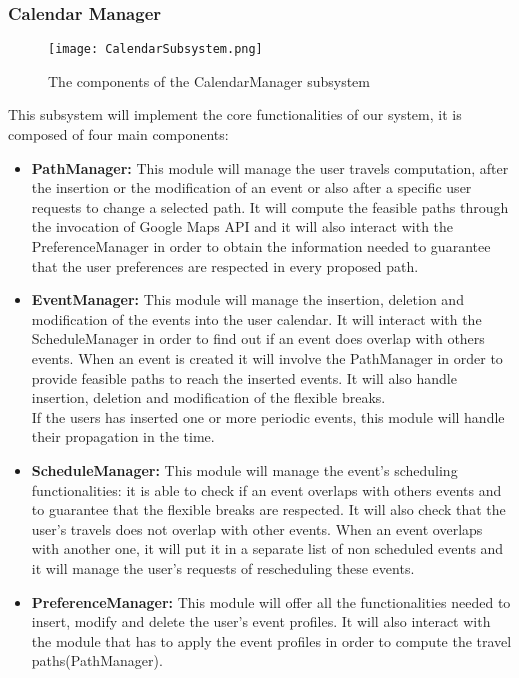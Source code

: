 \subsubsection{Calendar Manager}
\label{subsubsect:Calendar Manager}
\begin{figure}[H]
	\begin{center}
		\hspace*{-60pt}
		\texttt{[image: CalendarSubsystem.png]}
	\end{center}
	\caption{The components of the CalendarManager subsystem}
\end{figure}
	This subsystem will implement the core functionalities of our system, it is composed of four main components:
	\begin{itemize}
		\item \textbf{PathManager:} This module will manage the user travels computation, after the insertion or the modification of an event or also after a specific user requests to change a selected path. It will compute the feasible paths through the invocation of Google Maps API and it will also interact with the PreferenceManager in order to obtain the information needed to guarantee that the user preferences are respected in every proposed path. 
		\item \textbf{EventManager:} This module will manage the insertion, deletion and modification of the events into the user calendar. It will interact with the ScheduleManager in order to find out if an event does overlap with others events. When an event is created it will involve the PathManager in order to provide feasible paths to reach the inserted events. It will also handle insertion, deletion and modification of the flexible breaks. \\
	If the users has inserted one or more periodic events, this module will handle their propagation in the time. 
		\item \textbf{ScheduleManager:} This module will manage the event's scheduling functionalities: it is able to check if an event overlaps with others events and to guarantee that the flexible breaks are respected. It will also check that the user's travels does not overlap with other events. When an event overlaps with another one, it will put it in a separate list of non scheduled events and it will manage the user's requests of rescheduling these events.
		\item \textbf{PreferenceManager:} This module will offer all the functionalities needed to insert, modify and delete the user's event profiles. It will also interact with the module that has to apply the event profiles in order to compute the travel paths(PathManager).
	\end{itemize}
	
